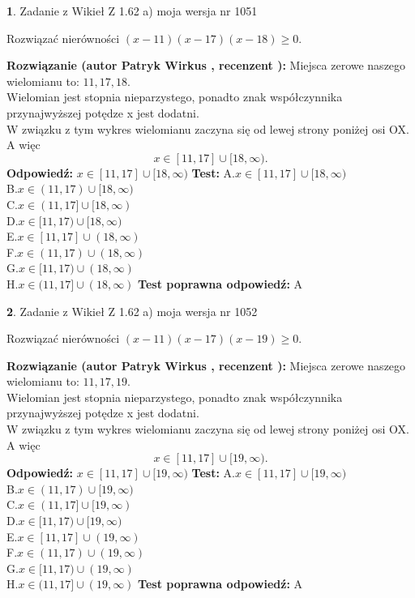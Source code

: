 \documentclass[12pt, a4paper]{article}
\theoremstyle{definition} %
\newtheorem{zad}{}
\newcommand{\zadStart}[1]{\begin{zad}#1\newline}
\newcommand{\zadStop}{\end{zad}}
\newcommand{\rozwStart}[2]{\noindent \textbf{Rozwiązanie (autor #1 , recenzent #2): }\newline}
\newcommand{\rozwStop}{\newline}
\newcommand{\odpStart}{\noindent \textbf{Odpowiedź:}\newline}
\newcommand{\odpStop}{\newline}
\newcommand{\testStart}{\noindent \textbf{Test:}\newline}
\newcommand{\testStop}{\newline}
\newcommand{\kluczStart}{\noindent \textbf{Test poprawna odpowiedź:}\newline}
\newcommand{\kluczStop}{\newline}
\begin{document}
\zadStart{Zadanie z Wikieł Z 1.62 a) moja wersja nr 1051}

Rozwiązać nierówności $(x-11)(x-17)(x-18)\ge0$.
\zadStop
\rozwStart{Patryk Wirkus}{}
Miejsca zerowe naszego wielomianu to: $11, 17, 18$.\\
Wielomian jest stopnia nieparzystego, ponadto znak współczynnika przy\linebreak najwyższej potędze x jest dodatni.\\ W związku z tym wykres wielomianu zaczyna się od lewej strony poniżej osi OX. A więc $$x \in [11,17] \cup [18,\infty).$$
\rozwStop
\odpStart
$x \in [11,17] \cup [18,\infty)$
\odpStop
\testStart
A.$x \in [11,17] \cup [18,\infty)$\\
B.$x \in (11,17) \cup [18,\infty)$\\
C.$x \in (11,17] \cup [18,\infty)$\\
D.$x \in [11,17) \cup [18,\infty)$\\
E.$x \in [11,17] \cup (18,\infty)$\\
F.$x \in (11,17) \cup (18,\infty)$\\
G.$x \in [11,17) \cup (18,\infty)$\\
H.$x \in (11,17] \cup (18,\infty)$
\testStop
\kluczStart
A
\kluczStop



\zadStart{Zadanie z Wikieł Z 1.62 a) moja wersja nr 1052}

Rozwiązać nierówności $(x-11)(x-17)(x-19)\ge0$.
\zadStop
\rozwStart{Patryk Wirkus}{}
Miejsca zerowe naszego wielomianu to: $11, 17, 19$.\\
Wielomian jest stopnia nieparzystego, ponadto znak współczynnika przy\linebreak najwyższej potędze x jest dodatni.\\ W związku z tym wykres wielomianu zaczyna się od lewej strony poniżej osi OX. A więc $$x \in [11,17] \cup [19,\infty).$$
\rozwStop
\odpStart
$x \in [11,17] \cup [19,\infty)$
\odpStop
\testStart
A.$x \in [11,17] \cup [19,\infty)$\\
B.$x \in (11,17) \cup [19,\infty)$\\
C.$x \in (11,17] \cup [19,\infty)$\\
D.$x \in [11,17) \cup [19,\infty)$\\
E.$x \in [11,17] \cup (19,\infty)$\\
F.$x \in (11,17) \cup (19,\infty)$\\
G.$x \in [11,17) \cup (19,\infty)$\\
H.$x \in (11,17] \cup (19,\infty)$
\testStop
\kluczStart
A
\kluczStop
\end{document}

